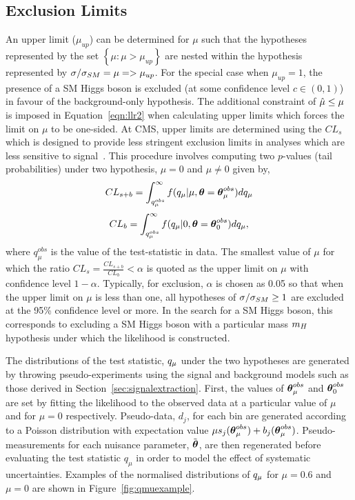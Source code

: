 \subsection{Exclusion Limits}
An upper limit ($\mu_{up}$) can be determined for $\mu$ such that
the hypotheses represented by the set $\left\{ \mu:\mu>\mu_{up} \right\}$
are nested within the hypothesis represented by $\sigma/\sigma_{SM}=\mu=>\mu_{up}$.
For the special case when $\mu_{up}=1$, the presence of a SM Higgs boson is excluded
(at some confidence level $c\in(0,1)$) in favour of the background-only hypothesis.
The additional constraint of $\hat{\mu} \le \mu$ is imposed in Equation~\ref{eqn:llr2} 
when calculating upper limits which forces the limit on $\mu$ to be one-sided.
At CMS, upper limits are determined using the $CL_{s}$
which is designed to provide less stringent exclusion limits in analyses 
which are less sensitive to signal~\citep{cls}. 
This procedure involves computing two $p$-values (tail probabilities) under two hypothesis, $\mu=0$ and $\mu\ne0$ given by,
\begin{equation}
	CL_{s+b} = \int_{q_{\mu}^{obs}}^{\infty} f(q_{\mu} | \mu,{\boldsymbol{\theta}}={\boldsymbol{\theta}}_{\mu}^{obs}) dq_{\mu}
\label{eqn:clsplusb}
\end{equation}
\begin{equation}
	CL_{b} = \int_{q_{\mu}^{obs}}^{\infty} f(q_{\mu} |0,{\boldsymbol{\theta}}={\boldsymbol{\theta}}_{0}^{obs}) dq_{\mu},
\label{eqn:clb}
\end{equation}
where $q_{\mu}^{obs}$ is the value of the test-statistic in data. 
The smallest value of $\mu$ for which the ratio $CL_{s}=\frac{\displaystyle CL_{s+b}}{\displaystyle CL_{b}}<\alpha$ is quoted as the upper limit on $\mu$ with confidence level 
$1-\alpha$. Typically, for exclusion, $\alpha$ is chosen as 0.05 so that 
when the upper limit on $\mu$ is less than one, all hypotheses of $\sigma/\sigma_{SM}\ge1$ are excluded 
at the 95\% confidence level or more. In the search for a SM Higgs boson, this corresponds to excluding 
a SM Higgs boson with a particular mass $m_{H}$ hypothesis under which the likelihood is constructed.
 
The distributions of the test statistic, $q_{\mu}$ under the two hypotheses are generated by 
throwing pseudo-experiments using the signal and background models such as those 
derived in Section~\ref{sec:signalextraction}.
First, the values of ${\boldsymbol{\theta}}^{obs}_{\mu}$ and ${\boldsymbol{\theta}}^{obs}_{0}$ are set by fitting the likelihood 
to the observed data at a particular value of $\mu$ and for $\mu=0$ respectively. Pseudo-data, $d_{j}$, for each bin
are generated according to a Poisson distribution with expectation value 
$\mu s_{j}({\boldsymbol{\theta}}_{\mu}^{obs})+b_{j}({\boldsymbol{\theta}}_{\mu}^{obs})$. Pseudo-measurements for each nuisance parameter,
$\tilde{{\boldsymbol{\theta}}}$, are then regenerated before evaluating the
test statistic $q_{\mu}$ in order to model the effect of systematic uncertainties. 
Examples of the normalised distributions of $q_{\mu}$ for $\mu=0.6$ and $\mu=0$ are shown in 
Figure~\ref{fig:qmuexample}.

